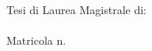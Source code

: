 \begin{titlepage}
\begin{center}
        \vfill  
        
        \flushright
        \normalsize{Tesi di Laurea Magistrale di:}\\
        \medskip \spacedlowsmallcaps{\myFirstAuthorName}\\
		Matricola n. \myMatrFirstAuthor \\ 
				
		\vfill 

		\centering {\myAcademicYear}                     

    \end{center}  
\end{titlepage}